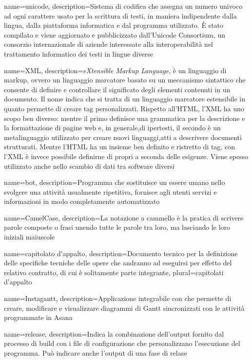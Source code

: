 {
	name=unicode,
	description={Sistema di codifica che assegna un numero univoco ad ogni carattere usato per la scrittura di testi, in maniera indipendente dalla lingua, dalla piattaforma informatica e dal programma utilizzato.
	È stato compilato e viene aggiornato e pubblicizzato dall'Unicode Consortium, un consorzio internazionale di aziende interessate alla interoperabilità nel trattamento informatico dei testi in lingue diverse}
}

{
	name=XML,
	description={\emph{eXtensible Markup Language}, è un linguaggio di markup, ovvero un linguaggio marcatore basato su un meccanismo sintattico che consente di definire e controllare il significato degli elementi contenuti in un documento. Il nome indica che si tratta di un linguaggio marcatore estensibile in quanto permette di creare tag personalizzati. Rispetto all’HTML, l’XML ha uno scopo ben diverso: mentre il primo definisce una grammatica per la descrizione e la formattazione di pagine web e, in generale,di ipertesti, il secondo è un metalinguaggio utilizzato per creare nuovi linguaggi,atti a descrivere documenti strutturati. Mentre l’HTML ha un insieme ben definito e ristretto di tag, con l’XML è invece possibile definirne di propri a seconda delle esigenze. Viene spesso utilizzato anche nello scambio di dati tra software diversi}
}

{
	name=bot,
	description={Programma che sostituisce un essere umano nello svolgere una attività usualmente ripetitiva, fornisce agli utenti servizi e informazioni in modo completamente automatizzato}
}

{
	name=CamelCase,
	description={La notazione a cammello è la pratica di scrivere parole composte o frasi unendo tutte le parole tra loro, ma lasciando le loro iniziali maiuscole}
}

{
	name=capitolato d'appalto,
	description={Documento tecnico per la definizione delle specifiche tecniche delle opere che andranno ad  eseguirsi per effetto del relativo contratto, di cui è solitamente parte integrante},
	plural=capitolati d'appalto
}

{
	name=Instagantt,
	description={Applicazione integrabile con  che permette di creare, modificare e visualizzare diagrammi di Gantt sincronizzati con le attività programmate in Asana}
}

{
	name=release,
	description={Indica la combinazione dell'output fornito dal processo di build con i file di configurazione che personalizzano l’esecuzione del programma. Può indicare anche l’output di una fase di relase}
}

